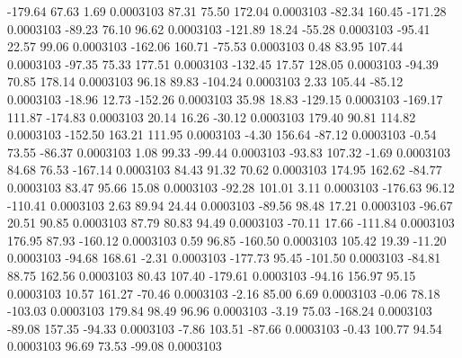      -179.64       67.63        1.69     0.0003103
       87.31       75.50      172.04     0.0003103
      -82.34      160.45     -171.28     0.0003103
      -89.23       76.10       96.62     0.0003103
     -121.89       18.24      -55.28     0.0003103
      -95.41       22.57       99.06     0.0003103
     -162.06      160.71      -75.53     0.0003103
        0.48       83.95      107.44     0.0003103
      -97.35       75.33      177.51     0.0003103
     -132.45       17.57      128.05     0.0003103
      -94.39       70.85      178.14     0.0003103
       96.18       89.83     -104.24     0.0003103
        2.33      105.44      -85.12     0.0003103
      -18.96       12.73     -152.26     0.0003103
       35.98       18.83     -129.15     0.0003103
     -169.17      111.87     -174.83     0.0003103
       20.14       16.26      -30.12     0.0003103
      179.40       90.81      114.82     0.0003103
     -152.50      163.21      111.95     0.0003103
       -4.30      156.64      -87.12     0.0003103
       -0.54       73.55      -86.37     0.0003103
        1.08       99.33      -99.44     0.0003103
      -93.83      107.32       -1.69     0.0003103
       84.68       76.53     -167.14     0.0003103
       84.43       91.32       70.62     0.0003103
      174.95      162.62      -84.77     0.0003103
       83.47       95.66       15.08     0.0003103
      -92.28      101.01        3.11     0.0003103
     -176.63       96.12     -110.41     0.0003103
        2.63       89.94       24.44     0.0003103
      -89.56       98.48       17.21     0.0003103
      -96.67       20.51       90.85     0.0003103
       87.79       80.83       94.49     0.0003103
      -70.11       17.66     -111.84     0.0003103
      176.95       87.93     -160.12     0.0003103
        0.59       96.85     -160.50     0.0003103
      105.42       19.39      -11.20     0.0003103
      -94.68      168.61       -2.31     0.0003103
     -177.73       95.45     -101.50     0.0003103
      -84.81       88.75      162.56     0.0003103
       80.43      107.40     -179.61     0.0003103
      -94.16      156.97       95.15     0.0003103
       10.57      161.27      -70.46     0.0003103
       -2.16       85.00        6.69     0.0003103
       -0.06       78.18     -103.03     0.0003103
      179.84       98.49       96.96     0.0003103
       -3.19       75.03     -168.24     0.0003103
      -89.08      157.35      -94.33     0.0003103
       -7.86      103.51      -87.66     0.0003103
       -0.43      100.77       94.54     0.0003103
       96.69       73.53      -99.08     0.0003103
